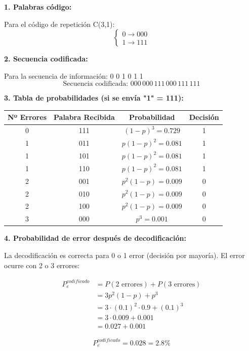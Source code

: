 \documentclass[10pt,a4paper]{article}
\begin{document}
\begin{solucion}
\textbf{1. Palabras código:}

Para el código de repetición C(3,1):
\[
\boxed{\begin{cases}
0 \rightarrow 000\\
1 \rightarrow 111
\end{cases}}
\]

\textbf{2. Secuencia codificada:}

Para la secuencia de información: 0 0 1 0 1 1
\[
\boxed{\text{Secuencia codificada: } 000\,000\,111\,000\,111\,111}
\]

\textbf{3. Tabla de probabilidades (si se envía "1" = 111):}

\begin{center}
\begin{tabular}{|c|c|c|c|}
\hline
\textbf{Nº Errores} & \textbf{Palabra Recibida} & \textbf{Probabilidad} & \textbf{Decisión} \\
\hline
0 & 111 & $(1-p)^3 = 0.729$ & 1 \\
\hline
1 & 011 & $p(1-p)^2 = 0.081$ & 1 \\
1 & 101 & $p(1-p)^2 = 0.081$ & 1 \\
1 & 110 & $p(1-p)^2 = 0.081$ & 1 \\
\hline
2 & 001 & $p^2(1-p) = 0.009$ & 0 \\
2 & 010 & $p^2(1-p) = 0.009$ & 0 \\
2 & 100 & $p^2(1-p) = 0.009$ & 0 \\
\hline
3 & 000 & $p^3 = 0.001$ & 0 \\
\hline
\end{tabular}
\end{center}

\textbf{4. Probabilidad de error después de decodificación:}

La decodificación es correcta para 0 o 1 error (decisión por mayoría). El error ocurre con 2 o 3 errores:

\begin{align*}
P_e^{codificado} &= P(\text{2 errores}) + P(\text{3 errores})\\
&= 3p^2(1-p) + p^3\\
&= 3 \cdot (0.1)^2 \cdot 0.9 + (0.1)^3\\
&= 3 \cdot 0.009 + 0.001\\
&= 0.027 + 0.001
\end{align*}

\[
\boxed{P_e^{codificado} = 0.028 = 2.8\%}
\]


\end{solucion}
\end{document}
